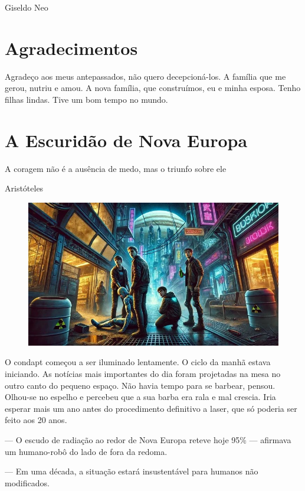 \documentclass[a4paper,14pt]{book}
\begin{document}
\begin{flushright}
Giseldo Neo
\end{flushright}

\chapter*{Agradecimentos}
Agradeço aos meus antepassados, não quero decepcioná-los. A família que me gerou, nutriu e amou. A nova família, que construímos, eu e minha esposa. Tenho filhas lindas. Tive um bom tempo no mundo.

\chapter{A Escuridão de Nova Europa}

\epigraph{A coragem não é a ausência de medo, mas o triunfo sobre ele}{Aristóteles}

\begin{figure}[h!]
    \includegraphics[width=1\linewidth]{img/a_escurida_de_nova_europa.jpg}
\end{figure}

O condapt começou a ser iluminado lentamente. O ciclo da manhã estava iniciando. As notícias mais importantes do dia foram projetadas na mesa no outro canto do pequeno espaço. Não havia tempo para se barbear, pensou. Olhou-se no espelho e percebeu que a sua barba era rala e mal crescia. Iria esperar mais um ano antes do procedimento definitivo a laser, que só poderia ser feito aos 20 anos.

— O escudo de radiação ao redor de Nova Europa reteve hoje 95\% — afirmava um humano-robô do lado de fora da redoma.

— Em uma década, a situação estará insustentável para humanos não modificados.
\end{document}
